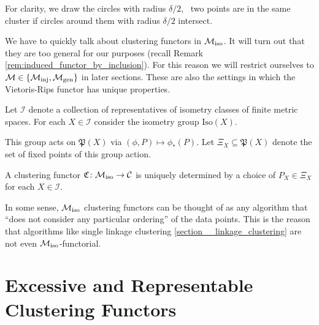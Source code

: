 \begin{example}{}{}
\begin{center}
\begin{minipage}{\textwidth}
\label{fig:vietoris_rips_example}
\end{minipage}
\end{center}
For clarity, we draw the circles with radius $\delta / 2$, \ie\ two points are in the same cluster if circles around them with radius $\delta / 2$ intersect.
\end{example}

We have to quickly talk about clustering functors in ${\mathcal{M}_\mathrm{iso}}$.
It will turn out that they are too general for our purposes (recall Remark \ref{rem:induced_functor_by_inclusion}).
For this reason we will restrict ourselves to $\mathcal{M} \in \{{\mathcal{M}_\mathrm{inj}}, {\mathcal{M}_\mathrm{gen}}\}$ in later sections. These are also the settings in which the Vietoris-Rips functor has unique properties.

\begin{myremark}{\cite[Thm.~6.1]{Carlsson2010}}{}
Let $\mathcal{I}$ denote a collection of representatives of isometry classes of finite metric spaces.
For each $X \in \mathcal{I}$ consider the isometry group $\mathrm{Iso}(X)$. \par

\medskip This group acts on $\mathfrak{P}(X)$ via $(\phi, P) \mapsto \phi_*(P)$.
Let $\Xi_X \subseteq \mathfrak{P}(X)$ denote the set of fixed points of this group action. \par

\medskip A clustering functor $\mathfrak{C}\colon {\mathcal{M}_\mathrm{iso}} \to \mathcal{C}$ is uniquely determined by a choice of $P_X \in \Xi_X$ for each $X \in \mathcal{I}$.
\end{myremark}

In some sense, ${\mathcal{M}_\mathrm{iso}}$ clustering functors can be thought of as any algorithm that ``does not consider any particular ordering'' of the data points.
This is the reason that algorithms like single linkage clustering \ref{section__linkage_clustering} are not even ${\mathcal{M}_\mathrm{iso}}$-functorial.

\section{Excessive and Representable Clustering Functors}

